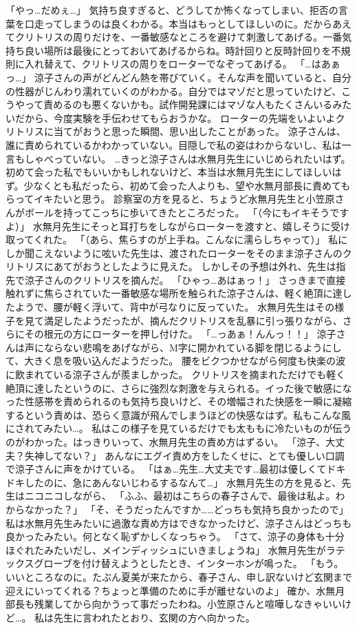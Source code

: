 「やっ…だめぇ…」
気持ち良すぎると、どうしてか怖くなってしまい、拒否の言葉を口走ってしまうのは良くわかる。本当はもっとしてほしいのに。だからあえてクリトリスの周りだけを、一番敏感なところを避けて刺激してあげる。一番気持ち良い場所は最後にとっておいてあげるからね。時計回りと反時計回りを不規則に入れ替えて、クリトリスの周りをローターでなぞってあげる。
「…はあぁっ…」
涼子さんの声がどんどん熱を帯びていく。そんな声を聞いていると、自分の性器がじんわり濡れていくのがわかる。自分ではマゾだと思っていたけど、こうやって責めるのも悪くないかも。試作開発課にはマゾな人もたくさんいるみたいだから、今度実験を手伝わせてもらおうかな。
ローターの先端をいよいよクリトリスに当てがおうと思った瞬間、思い出したことがあった。
涼子さんは、誰に責められているかわかっていない。目隠しで私の姿はわからないし、私は一言もしゃべっていない。
…きっと涼子さんは水無月先生にいじめられたいはず。初めて会った私でもいいかもしれないけど、本当は水無月先生にしてほしいはず。少なくとも私だったら、初めて会った人よりも、望や水無月部長に責めてもらってイキたいと思う。
診察室の方を見ると、ちょうど水無月先生と小笠原さんがボールを持ってこっちに歩いてきたところだった。
「（今にもイキそうですよ）」
水無月先生にそっと耳打ちをしながらローターを渡すと、嬉しそうに受け取ってくれた。
「（あら、焦らすのが上手ね。こんなに濡らしちゃって）」
私にしか聞こえないように呟いた先生は、渡されたローターをそのまま涼子さんのクリトリスにあてがおうとしたように見えた。
しかしその予想は外れ、先生は指先で涼子さんのクリトリスを摘んだ。
「ひゃっ…あはぁっ！」
さっきまで直接触れずに焦らされていた一番敏感な場所を触られた涼子さんは、軽く絶頂に達したようで、腰が軽く浮いて、背中が弓なりに反っていた。
水無月先生はその様子を見て満足したようだったが、摘んだクリトリスを乱暴に引っ張りながら、さらにその根元の方にローターを押し付けた。
「…っあぁ！んんっ！！」
涼子さんは声にならない悲鳴をあげながら、M字に開かれている脚を閉じるようにして、大きく息を吸い込んだようだった。
腰をビクつかせながら何度も快楽の波に飲まれている涼子さんが羨ましかった。
クリトリスを摘まれただけでも軽く絶頂に達したというのに、さらに強烈な刺激を与えられる。イった後で敏感になった性感帯を責められるのも気持ち良いけど、その増幅された快感を一瞬に凝縮するという責めは、恐らく意識が飛んでしまうほどの快感なはず。私もこんな風にされてみたい…。
私はこの様子を見ているだけでも太ももに冷たいものが伝うのがわかった。はっきりいって、水無月先生の責め方はずるい。
「涼子、大丈夫？失神してない？」
あんなにエグイ責め方をしたくせに、とても優しい口調で涼子さんに声をかけている。
「はぁ…先生…大丈夫です…最初は優しくてドキドキしたのに、急にあんないじわるするなんて…」
水無月先生の方を見ると、先生はニコニコしながら、
「ふふ、最初はこちらの春子さんで、最後は私よ。わからなかった？」
「そ、そうだったんですか……どっちも気持ち良かったので」
私は水無月先生みたいに過激な責め方はできなかったけど、涼子さんはどっちも良かったみたい。何となく恥ずかしくなっちゃう。
「さて、涼子の身体も十分ほぐれたみたいだし、メインディッシュにいきましょうね」
水無月先生がラテックスグローブを付け替えようとしたとき、インターホンが鳴った。
「もう。いいところなのに。たぶん夏美が来たから、春子さん、申し訳ないけど玄関まで迎えにいってくれる？ちょっと準備のために手が離せないのよ」
確か、水無月部長も残業してから向かうって事だったわね。小笠原さんと喧嘩しなきゃいいけど…。
私は先生に言われたとおり、玄関の方へ向かった。


